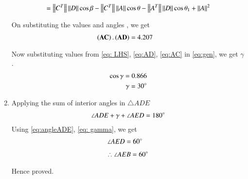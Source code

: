 \begin{enumerate}[label=\thesection.\arabic*.,ref=\thesection.\theenumi]
\begin{equation}
 = \left\lVert C^T\right\rVert\left\lVert D\right\rVert\cos\beta - \left\lVert C^T\right\rVert\left\lVert A\right\rVert\cos\theta - \left\lVert A^T\right\rVert\left\lVert D\right\rVert\cos\theta_1 + \left\lVert A\right\rVert^2
\end{equation}

On substituting the values and angles , we get
\begin{align}
\left(\mathbf{AC}\right).\left(\mathbf{AD}\right) &= 4.207
\label{eq: LHS}
\end{align}

Now substituting values from \eqref{eq: LHS}, \eqref{eq:AD}, \eqref{eq:AC} in \eqref{eq:gen}, we get $\gamma$.
\begin{align}
\cos\gamma = 0.866 \\
\gamma= 30\degree
\label{eq: gamma}
\end{align}



    
\item Applying the sum of interior angles in $\triangle ADE$ 
\begin{align}
\angle ADE + \gamma + \angle AED = 180\degree
\label{eq:eq_6}
\end{align}
Using \eqref{eq:angleADE}, \eqref{eq: gamma}, we get
\begin{align}
\angle AED &= 60\degree
\end{align}
\begin{align}
\therefore \angle AEB = 60\degree 
\end{align}
    
Hence proved.
    
\end{enumerate}   
       

